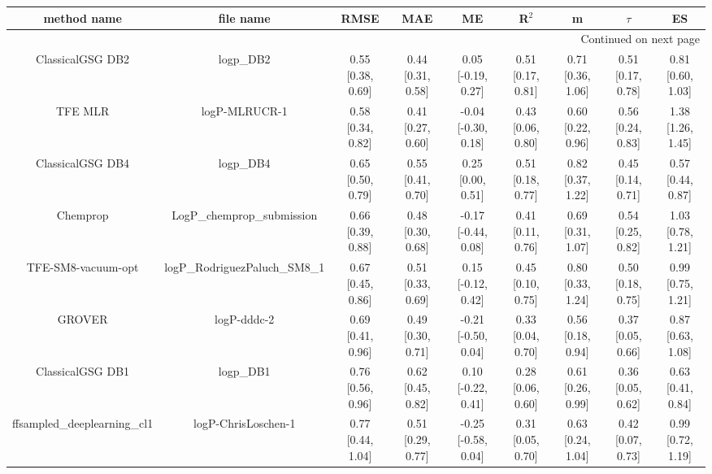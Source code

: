 \documentclass{article}
\begin{document}
\begin{center}
\scriptsize
\begin{longtable}{|ccccccccc|}
\toprule
                  method name &                                      file name &               RMSE &                MAE &                    ME &              R$^2$ &                     m &                $\tau$ &                    ES \\
\midrule
\endhead
\midrule
\multicolumn{9}{r}{{Continued on next page}} \\
\midrule
\endfoot

\bottomrule
\endlastfoot
             ClassicalGSG DB2 &                                      logp\_DB2 &  0.55 [0.38, 0.69] &  0.44 [0.31, 0.58] &    0.05 [-0.19, 0.27] &  0.51 [0.17, 0.81] &     0.71 [0.36, 1.06] &     0.51 [0.17, 0.78] &     0.81 [0.60, 1.03] \\
                      TFE MLR &                                  logP-MLRUCR-1 &  0.58 [0.34, 0.82] &  0.41 [0.27, 0.60] &   -0.04 [-0.30, 0.18] &  0.43 [0.06, 0.80] &     0.60 [0.22, 0.96] &     0.56 [0.24, 0.83] &     1.38 [1.26, 1.45] \\
             ClassicalGSG DB4 &                                      logp\_DB4 &  0.65 [0.50, 0.79] &  0.55 [0.41, 0.70] &     0.25 [0.00, 0.51] &  0.51 [0.18, 0.77] &     0.82 [0.37, 1.22] &     0.45 [0.14, 0.71] &     0.57 [0.44, 0.87] \\
                     Chemprop &                     LogP\_chemprop\_submission &  0.66 [0.39, 0.88] &  0.48 [0.30, 0.68] &   -0.17 [-0.44, 0.08] &  0.41 [0.11, 0.76] &     0.69 [0.31, 1.07] &     0.54 [0.25, 0.82] &     1.03 [0.78, 1.21] \\
           TFE-SM8-vacuum-opt &                  logP\_RodriguezPaluch\_SM8\_1 &  0.67 [0.45, 0.86] &  0.51 [0.33, 0.69] &    0.15 [-0.12, 0.42] &  0.45 [0.10, 0.75] &     0.80 [0.33, 1.24] &     0.50 [0.18, 0.75] &     0.99 [0.75, 1.21] \\
                       GROVER &                                    logP-dddc-2 &  0.69 [0.41, 0.96] &  0.49 [0.30, 0.71] &   -0.21 [-0.50, 0.04] &  0.33 [0.04, 0.70] &     0.56 [0.18, 0.94] &     0.37 [0.05, 0.66] &     0.87 [0.63, 1.08] \\
             ClassicalGSG DB1 &                                      logp\_DB1 &  0.76 [0.56, 0.96] &  0.62 [0.45, 0.82] &    0.10 [-0.22, 0.41] &  0.28 [0.06, 0.60] &     0.61 [0.26, 0.99] &     0.36 [0.05, 0.62] &     0.63 [0.41, 0.84] \\
   ffsampled_deeplearning_cl1 &                            logP-ChrisLoschen-1 &  0.77 [0.44, 1.04] &  0.51 [0.29, 0.77] &   -0.25 [-0.58, 0.04] &  0.31 [0.05, 0.70] &     0.63 [0.24, 1.04] &     0.42 [0.07, 0.73] &     0.99 [0.72, 1.19] \\

\end{longtable}
\end{center}
\end{document}
